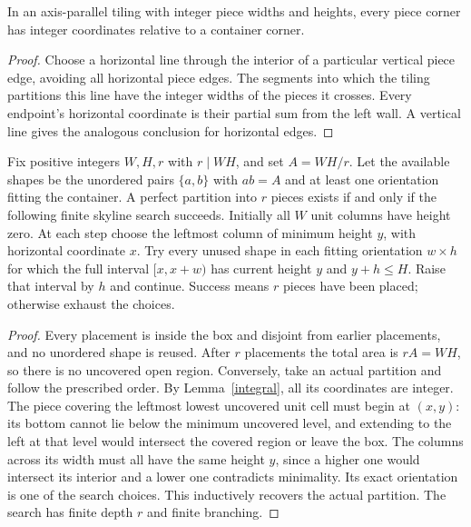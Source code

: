 \documentclass[11pt]{article}
\begin{document}
\begin{lemma}\label{integral}
In an axis-parallel tiling with integer piece widths and heights, every piece
corner has integer coordinates relative to a container corner.
\end{lemma}
\begin{proof}
Choose a horizontal line through the interior of a particular vertical piece
edge, avoiding all horizontal piece edges. The segments into which the tiling
partitions this line have the integer widths of the pieces it crosses.
Every endpoint's horizontal coordinate is their partial sum from the left wall.
A vertical line gives the analogous conclusion for horizontal edges.
\end{proof}

\begin{proposition}\label{search}
Fix positive integers $W,H,r$ with $r\mid WH$, and set $A=WH/r$.
Let the available shapes be the unordered pairs $\{a,b\}$ with $ab=A$ and
at least one orientation fitting the container. A perfect partition into $r$
pieces exists if and only if the following finite skyline search succeeds.
Initially all $W$ unit columns have height zero. At each step choose the leftmost
column of minimum height $y$, with horizontal coordinate $x$. Try every unused
shape in each fitting orientation $w\times h$ for which the full interval
$[x,x+w)$ has current height $y$ and $y+h\le H$. Raise that interval by $h$ and
continue. Success means $r$ pieces have been placed; otherwise exhaust the choices.
\end{proposition}
\begin{proof}
Every placement is inside the box and disjoint from earlier placements, and no
unordered shape is reused. After $r$ placements the total area is $rA=WH$, so
there is no uncovered open region. Conversely, take an actual partition and
follow the prescribed order. By Lemma~\ref{integral}, all its coordinates are
integer. The piece covering the leftmost lowest uncovered unit cell must begin
at $(x,y)$: its bottom cannot lie below the minimum uncovered level, and extending
to the left at that level would intersect the covered region or leave the box.
The columns across its width must all have the same height $y$, since a higher
one would intersect its interior and a lower one contradicts minimality.
Its exact orientation is one of the search choices. This inductively recovers
the actual partition. The search has finite depth $r$ and finite branching.
\end{proof}
\end{document}
